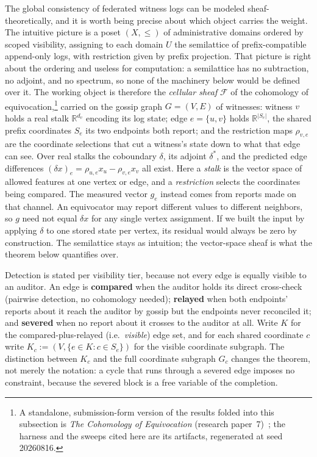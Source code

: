 \documentclass[11pt,a4paper]{article}
\theoremstyle{definition}
\theoremstyle{remark}
\begin{document}
The global consistency of federated witness logs can be modeled sheaf-theoretically, and it is worth being precise about which object carries the weight. The intuitive picture is a poset $(X, \le)$ of administrative domains ordered by scoped visibility, assigning to each domain $U$ the semilattice of prefix-compatible append-only logs, with restriction given by prefix projection. That picture is right about the ordering and useless for computation: a semilattice has no subtraction, no adjoint, and no spectrum, so none of the machinery below would be defined over it. The working object is therefore the \emph{cellular sheaf} $\mathcal{F}$ of the cohomology of equivocation,\footnote{A standalone, submission-form version of the results folded into this subsection is \emph{The Cohomology of Equivocation} (research paper~7)~\cite{owens2026sheaf}; the harness and the sweeps cited here are its artifacts, regenerated at seed 20260816.} carried on the gossip graph $G=(V,E)$ of witnesses: witness $v$ holds a real stalk $\mathbb{R}^{d_v}$ encoding its log state; edge $e=\{u,v\}$ holds $\mathbb{R}^{|S_e|}$, the shared prefix coordinates $S_e$ its two endpoints both report; and the restriction maps $\rho_{v,e}$ are the coordinate selections that cut a witness's state down to what that edge can see. Over real stalks the coboundary $\delta$, its adjoint $\delta^*$, and the predicted edge differences $(\delta x)_e=\rho_{u,e}x_u-\rho_{v,e}x_v$
all exist. Here a \emph{stalk} is the vector space of allowed features at one
vertex or edge, and a \emph{restriction} selects the coordinates being compared.
The measured vector $g_e$ instead comes from reports made on that channel.
An equivocator may report different values to different neighbors, so $g$
need not equal $\delta x$ for any single vertex assignment. If we built the
input by applying $\delta$ to one stored state per vertex, its residual would
always be zero by construction. The semilattice stays as intuition; the vector-space sheaf is what the theorem below quantifies over.

Detection is stated per visibility tier, because not every edge is equally visible to an auditor. An edge is \textbf{compared} when the auditor holds its direct cross-check (pairwise detection, no cohomology needed); \textbf{relayed} when both endpoints' reports about it reach the auditor by gossip but the endpoints never reconciled it; and \textbf{severed} when no report about it crosses to the auditor at all. Write $K$ for the compared-plus-relayed (i.e.\ \emph{visible}) edge set, and for each shared coordinate $c$ write $K_c := (V, \{e \in K : c \in S_e\})$ for the visible coordinate subgraph. The distinction between $K_c$ and the full coordinate subgraph $G_c$ changes the theorem, not merely the notation: a cycle that runs through a severed edge imposes no constraint, because the severed block is a free variable of the completion.
\end{document}
